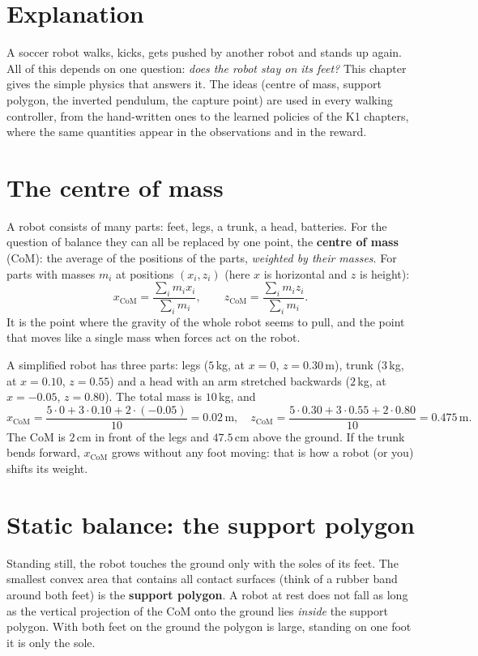 \label{ch:ctl2}

\section*{Explanation}
A soccer robot walks, kicks, gets pushed by another robot and stands up again. All of this depends on one question: \emph{does the robot stay on its feet?} This chapter gives the simple physics that answers it. The ideas (centre of mass, support polygon, the inverted pendulum, the capture point) are used in every walking controller, from the hand-written ones to the learned policies of the K1 chapters, where the same quantities appear in the observations and in the reward.

\section*{The centre of mass}
A robot consists of many parts: feet, legs, a trunk, a head, batteries. For the question of balance they can all be replaced by one point, the \textbf{centre of mass} (CoM): the average of the positions of the parts, \emph{weighted by their masses}. For parts with masses $m_i$ at positions $(x_i,z_i)$ (here $x$ is horizontal and $z$ is height):
\[
x_{\text{CoM}}=\frac{\sum_i m_i x_i}{\sum_i m_i},\qquad z_{\text{CoM}}=\frac{\sum_i m_i z_i}{\sum_i m_i}.
\]
It is the point where the gravity of the whole robot seems to pull, and the point that moves like a single mass when forces act on the robot.

\begin{example}
A simplified robot has three parts: legs ($5$\,kg, at $x=0$, $z=0.30$\,m), trunk ($3$\,kg, at $x=0.10$, $z=0.55$) and a head with an arm stretched backwards ($2$\,kg, at $x=-0.05$, $z=0.80$). The total mass is $10$\,kg, and
\[
x_{\text{CoM}}=\frac{5\cdot0+3\cdot0.10+2\cdot(-0.05)}{10}=0.02\,\text{m},\quad
z_{\text{CoM}}=\frac{5\cdot0.30+3\cdot0.55+2\cdot0.80}{10}=0.475\,\text{m}.
\]
The CoM is $2$\,cm in front of the legs and $47.5$\,cm above the ground. If the trunk bends forward, $x_{\text{CoM}}$ grows without any foot moving: that is how a robot (or you) shifts its weight.
\end{example}

\section*{Static balance: the support polygon}
Standing still, the robot touches the ground only with the soles of its feet. The smallest convex area that contains all contact surfaces (think of a rubber band around both feet) is the \textbf{support polygon}. A robot at rest does not fall as long as the vertical projection of the CoM onto the ground lies \emph{inside} the support polygon. With both feet on the ground the polygon is large, standing on one foot it is only the sole.

